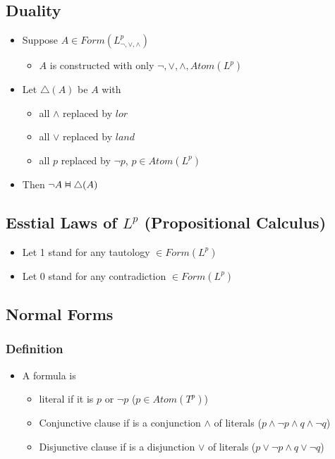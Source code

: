 \documentclass[11pt]{article}
\newcommand{\vDashv}{%
  \mathrel{%
    \text{%
      \ooalign{$\vDash$\cr\reflectbox{$\vDash$}\cr}%
    }%
  }%
}
\begin{document}
\subsection{Duality}
\begin{itemize}
    \item Suppose $A\in Form(L^p_{\neg, \lor,\land})$
    \begin{itemize}
        \item $A$ is constructed with only $\neg, \lor,\land, Atom(L^p)$
    \end{itemize}
    \item Let $\triangle(A)$ be $A$ with 
    \begin{itemize}
        \item all $\land$ replaced by $lor$
        \item all $\lor$ replaced by $land$
        \item all $p$ replaced by $\neg p$, $p\in Atom(L^p)$
    \end{itemize}
    \item Then $\neg A\vDashv\triangle(A)$
\end{itemize}
\subsection{Esstial Laws of $L^p$ (Propositional Calculus)}
\begin{itemize}
    \item Let 1 stand for any tautology $\in Form(L^p)$
    \item Let 0 stand for any contradiction $\in Form(L^p)$
\end{itemize}
\begin{minipage}[t]{\linewidth}
\end{minipage}
\begin{minipage}[t]{\linewidth}
\end{minipage}
\subsection{Normal Forms}
\subsubsection{Definition}
\begin{itemize}
    \item A formula is 
    \begin{itemize}
        \item literal if it is $p$ or $\neg p$ ($p\in Atom(T^p)$)
        \item Conjunctive clause if is a conjunction $\land$ of literals ($p\land\neg p\land q\land \neg q$)
        \item Disjunctive clause if is a disjunction $\lor$ of literals ($p\lor\neg p\land q\lor \neg q$)
    \end{itemize}
\end{itemize}
\end{document}
